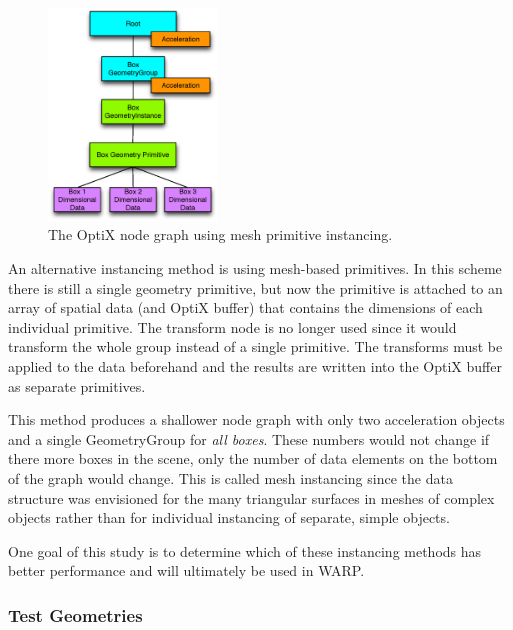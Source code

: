 \begin{figure}[h!] 
  \centering
    \includegraphics[width=0.4\textwidth]{graphics/primitive_instancing.eps}
     \caption{The OptiX node graph using mesh primitive instancing. \label{primitive_instancing} }
\end{figure}

An alternative instancing method is using mesh-based primitives.  In this scheme there is still a single geometry primitive, but now the primitive is attached to an array of spatial data (and OptiX buffer) that contains the dimensions of each individual primitive.  The transform node is no longer used since it would transform the whole group instead of a single primitive.   The transforms must be applied to the data beforehand and the results are written into the OptiX buffer as separate primitives.  

This method produces a shallower node graph with only two acceleration objects and a single GeometryGroup for \emph{all boxes}.  These numbers would not change if there more boxes in the scene, only the number of data elements on the bottom of the graph would change.  This is called mesh instancing since the data structure was envisioned for the many triangular surfaces in meshes of complex objects rather than for individual instancing of separate, simple objects.

One goal of this study is to determine which of these instancing methods has better performance and will ultimately be used in WARP.

\subsubsection{Test Geometries}

